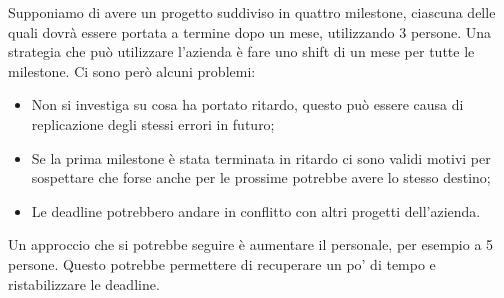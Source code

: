 Supponiamo di avere un progetto suddiviso in quattro milestone, ciascuna delle quali dovrà essere portata a termine dopo un mese, utilizzando 3 persone. Una strategia che può utilizzare l'azienda è fare uno shift di un mese per tutte le milestone. Ci sono però alcuni problemi:
\begin{itemize}
	\item Non si investiga su cosa ha portato ritardo, questo può essere causa di replicazione degli stessi errori in futuro;
	\item Se la prima milestone è stata terminata in ritardo ci sono validi motivi per sospettare che forse anche per le prossime potrebbe avere lo stesso destino;
	\item Le deadline potrebbero andare in conflitto con altri progetti dell'azienda.
\end{itemize}
Un approccio che si potrebbe seguire è aumentare il personale, per esempio a 5 persone. Questo potrebbe permettere di recuperare un po' di tempo e ristabilizzare le deadline.
